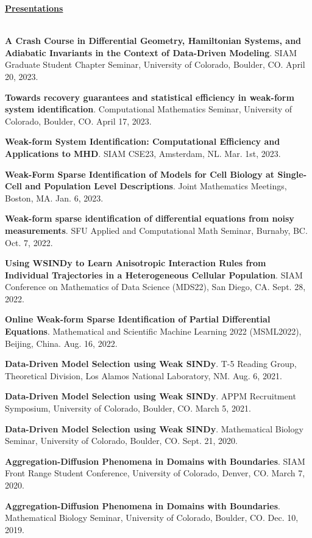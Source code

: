 \documentclass[letterpaper,11pt,oneside]{article}
\newcommand{\headr}[1]{\vspace{10pt}\uline{\Large{\textbf{#1}} \hfill } \\ \vspace{-10pt}\\}
\begin{document}
\headr{Presentations}
\begin{enumerate}[label={[\arabic*]}]
\item \textbf{A Crash Course in Differential Geometry, Hamiltonian Systems, and Adiabatic Invariants in the Context of Data-Driven Modeling}. SIAM Graduate Student Chapter Seminar, University of Colorado, Boulder, CO. April 20, 2023.
\item \textbf{Towards recovery guarantees and statistical efficiency in weak-form system identification}. Computational Mathematics Seminar, University of Colorado, Boulder, CO. April 17, 2023.
\item \textbf{Weak-form System Identification: Computational Efficiency and Applications to MHD}. SIAM CSE23, Amsterdam, NL. Mar. 1st, 2023.
\item \textbf{Weak-Form Sparse Identification of Models for Cell Biology at Single-Cell and Population Level Descriptions}. Joint Mathematics Meetings, Boston, MA. Jan. 6, 2023.
\item \textbf{Weak-form sparse identification of differential equations from noisy measurements}. SFU Applied and Computational Math Seminar, Burnaby, BC. Oct. 7, 2022.
\item \textbf{Using WSINDy to Learn Anisotropic Interaction 
Rules from Individual Trajectories in a Heterogeneous Cellular Population}. SIAM Conference on Mathematics of Data Science (MDS22), San Diego, CA. Sept. 28, 2022.
\item \textbf{Online Weak-form Sparse Identification of Partial Differential Equations}. Mathematical and Scientific Machine Learning 2022 (MSML2022), Beijing, China. Aug. 16, 2022.
\item \textbf{Data-Driven Model Selection using Weak SINDy}. T-5 Reading Group, Theoretical Division, Los Alamos National Laboratory, NM. Aug. 6, 2021.
\item \textbf{Data-Driven Model Selection using Weak SINDy}. APPM Recruitment Symposium, University of Colorado, Boulder, CO. March 5, 2021.
\item \textbf{Data-Driven Model Selection using Weak SINDy}. Mathematical Biology Seminar, University of Colorado, Boulder, CO. Sept. 21, 2020.
\item \textbf{Aggregation-Diffusion Phenomena in Domains with Boundaries}. SIAM Front Range Student Conference, University of Colorado, Denver, CO. March 7, 2020.
\item \textbf{Aggregation-Diffusion Phenomena in Domains with Boundaries}. Mathematical Biology Seminar, University of Colorado, Boulder, CO. Dec. 10, 2019.

\end{enumerate}
\end{document}
